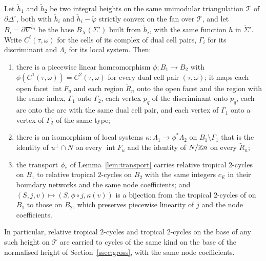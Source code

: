 \begin{lemma}\label{lem:height}
Let $\check h_1$ and $\check h_2$ be two integral heights on the same unimodular triangulation $\mathcal T$ of
$\partial\Delta^\circ$, both with $\check h_i$ and $\check h_i-\check\varphi$ strictly convex on the fan over $\mathcal T$, and
let $B_i=\partial\nabla^{\check h_i}$ be the base $B_X(\Sigma')$ built from $\check h_i$, with the same function $h$ in
$\widetilde\Sigma'$. Write $C^i(\tau,\omega)$ for the cells of its complex of dual cell pairs, $\Gamma_i$ for its discriminant and
$\Lambda_i$ for its local system. Then:
\begin{enumerate}
\item there is a piecewise linear homeomorphism $\phi\colon B_1\to B_2$ with $\phi(C^1(\tau,\omega))=C^2(\tau,\omega)$ for
every dual cell pair $(\tau,\omega)$; it maps each open facet $\operatorname{int}F_u$ and each region $\widetilde R_n$ onto the
open facet and the region with the same index, $\Gamma_1$ onto $\Gamma_2$, each vertex $p_q$ of the discriminant onto $p_q$, each arc onto
the arc with the same dual cell pair, and each vertex of $\Gamma_1$ onto a vertex of $\Gamma_2$ of the same type;
\item there is an isomorphism of local systems $\kappa\colon\Lambda_1\to\phi^*\Lambda_2$ on $B_1\setminus\Gamma_1$ that is the
identity of $u^\perp\cap N$ on every $\operatorname{int}F_u$ and the identity of $N/\mathbb Z n$ on every $\widetilde R_n$;
\item the transport $\phi_*$ of Lemma~\ref{lem:transport} carries relative tropical $2$-cycles on $B_1$ to relative
tropical $2$-cycles on $B_2$ with the same integers $c_E$ in their boundary networks and the same node coefficients; and
$(S,j,v)\mapsto(S,\phi\circ j,\kappa(v))$ is a bijection from the tropical $2$-cycles of \cite[Def.~7.2]{CBM} on $B_1$ to
those on $B_2$, which preserves piecewise linearity of $j$ and the node coefficients.
\end{enumerate}
In particular, relative tropical $2$-cycles and tropical $2$-cycles on the base of any such height on $\mathcal T$ are
carried to cycles of the same kind on the base of the normalised height of Section~\ref{ssec:gross}, with the same node
coefficients.
\end{lemma}
